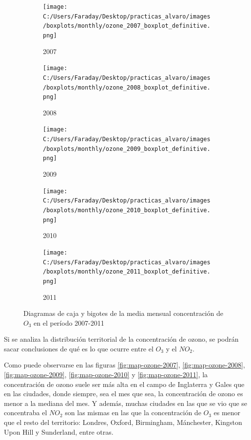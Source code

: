 \documentclass[12pt]{article}
\begin{document}
\begin{figure}[H]
\centering
\begin{subfigure}[H]{0.30\textwidth}
\texttt{[image: C:/Users/Faraday/Desktop/practicas\_alvaro/images/boxplots/monthly/ozone\_2007\_boxplot\_definitive.png]}
\captionsetup{labelformat=empty}
\caption{2007}
\label{fig:box-ozone-2007}
\end{subfigure}
%
\begin{subfigure}[H]{0.30\textwidth}
\texttt{[image: C:/Users/Faraday/Desktop/practicas\_alvaro/images/boxplots/monthly/ozone\_2008\_boxplot\_definitive.png]}
\captionsetup{labelformat=empty}
\caption{2008}
\label{fig:box-ozone-2008}
\end{subfigure}
%
\begin{subfigure}[H]{0.30\textwidth}
\texttt{[image: C:/Users/Faraday/Desktop/practicas\_alvaro/images/boxplots/monthly/ozone\_2009\_boxplot\_definitive.png]}
\captionsetup{labelformat=empty}
\caption{2009}
\label{fig:box-ozone-2009}
\end{subfigure}

\begin{subfigure}[H]{0.30\textwidth}
\texttt{[image: C:/Users/Faraday/Desktop/practicas\_alvaro/images/boxplots/monthly/ozone\_2010\_boxplot\_definitive.png]}
\captionsetup{labelformat=empty}
\caption{2010}
\label{fig:box-ozone-2010}
\end{subfigure}
%
\begin{subfigure}[H]{0.30\textwidth}
\texttt{[image: C:/Users/Faraday/Desktop/practicas\_alvaro/images/boxplots/monthly/ozone\_2011\_boxplot\_definitive.png]}
\captionsetup{labelformat=empty}
\caption{2011}
\label{fig:box-ozone-2011}
\end{subfigure}
\caption{Diagramas de caja y bigotes de la media mensual concentración de $O_{3}$ en el período 2007-2011}
\label{fig:box-ozone-monthly}
\end{figure}

Si se analiza la distribución territorial de la concentración de ozono, se podrán sacar conclusiones de qué es lo que ocurre entre el $O_{3}$ y el $NO_{2}$.

Como puede observarse en las figuras \ref{fig:map-ozone-2007}, \ref{fig:map-ozone-2008}, \ref{fig:map-ozone-2009}, \ref{fig:map-ozone-2010} y \ref{fig:map-ozone-2011}, la concentración de ozono suele ser más alta en el campo de Inglaterra y Gales que en las ciudades, donde siempre, sea el mes que sea, la concentración de ozono es menor a la mediana del mes. Y además, muchas ciudades en las que se vio que se concentraba el $NO_{2}$ son las mismas en las que la concentración de $O_{3}$ es menor que el resto del territorio: Londres, Oxford, Birmingham, Mánchester, Kingston Upon Hill y Sunderland, entre otras.
\end{document}
